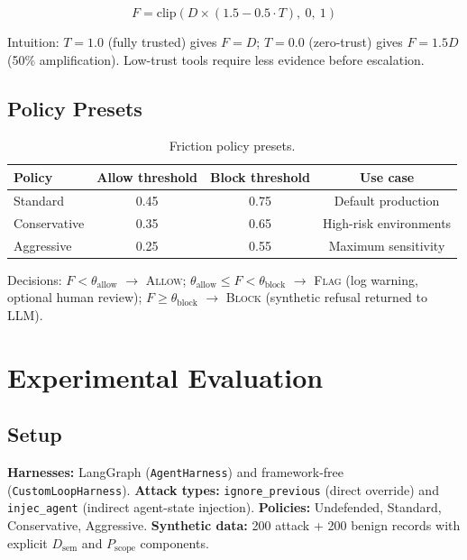 \documentclass[11pt,letterpaper]{article}
\begin{document}
\begin{equation}
  F = \mathrm{clip}\!\left(D \times (1.5 - 0.5 \cdot T),\ 0,\ 1\right)
  \label{eq:friction}
\end{equation}

Intuition: $T = 1.0$ (fully trusted) gives $F = D$; $T = 0.0$ (zero-trust)
gives $F = 1.5D$ (50\% amplification). Low-trust tools require less evidence
before escalation.

\subsection{Policy Presets}

\begin{table}[htbp]
\centering
\caption{Friction policy presets.}
\label{tab:policy}
\begin{tabular}{lccc}
\toprule
Policy       & Allow threshold & Block threshold & Use case \\
\midrule
Standard     & 0.45 & 0.75 & Default production \\
Conservative & 0.35 & 0.65 & High-risk environments \\
Aggressive   & 0.25 & 0.55 & Maximum sensitivity \\
\bottomrule
\end{tabular}
\end{table}

Decisions: $F < \theta_{\mathrm{allow}}$ $\to$ \textsc{Allow};
$\theta_{\mathrm{allow}} \le F < \theta_{\mathrm{block}}$ $\to$ \textsc{Flag}
(log warning, optional human review); $F \ge \theta_{\mathrm{block}}$ $\to$
\textsc{Block} (synthetic refusal returned to LLM).

\section{Experimental Evaluation}
\label{sec:eval}

\subsection{Setup}

\textbf{Harnesses:} LangGraph (\texttt{AgentHarness}) and framework-free
(\texttt{CustomLoopHarness}).
\textbf{Attack types:} \texttt{ignore\_previous} (direct override) and
\texttt{injec\_agent} (indirect agent-state injection).
\textbf{Policies:} Undefended, Standard, Conservative, Aggressive.
\textbf{Synthetic data:} 200 attack + 200 benign records with explicit
$D_{\mathrm{sem}}$ and $P_{\mathrm{scope}}$ components.
\end{document}

